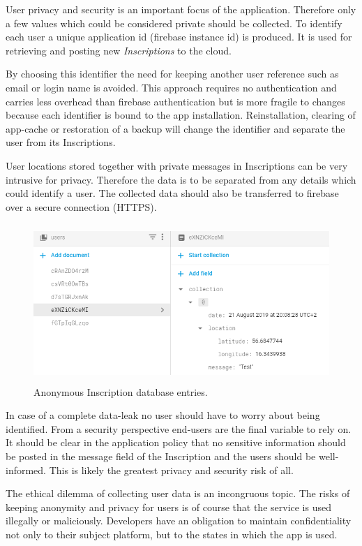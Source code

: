 \documentclass[]{article}
\begin{document}
\begin{flushleft}
User privacy and security is an important focus of the application. Therefore only a few values which could be considered private should be collected. To identify each user a unique application id (firebase instance id) is produced. It is used for retrieving and posting new \textit{Inscriptions} to the cloud.\smallskip

By choosing this identifier the need for keeping another user reference such as email or login name is avoided. This approach requires no authentication and carries less overhead than firebase authentication but is more fragile to changes because each identifier is bound to the app installation. Reinstallation, clearing of app-cache or restoration of a backup will change the identifier and separate the user from its Inscriptions.\medskip

User locations stored together with private messages in Inscriptions can be very intrusive for privacy. Therefore the data is to be separated from any details which could identify a user. The collected data should also be transferred to firebase over a secure connection (HTTPS)\parencite{deception}. 

\begin{figure}[H]
	\includegraphics[width=\linewidth, height=60mm]{leak.png}
	\caption{Anonymous Inscription database entries.}
	\label{fig:anon_entries}
\end{figure}


In case of a complete data-leak no user should have to worry about being identified. From a security perspective end-users are the final variable to rely on. It should be clear in the application policy that no sensitive information should be posted in the message field of the Inscription and the users should be well-informed. This is likely the greatest privacy and security risk of all.\medskip

The ethical dilemma of collecting user data is an incongruous topic. The risks of keeping anonymity and privacy for users is of course that the service is used illegally or maliciously. Developers have an obligation to maintain confidentiality not only to their subject platform, but to the states in which the app is used.\medskip


\end{flushleft}
\end{document}
